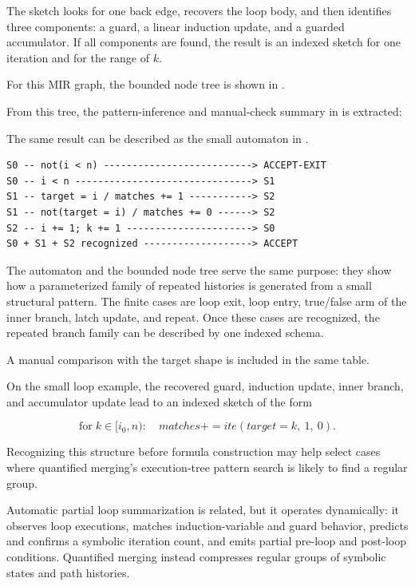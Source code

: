 \documentclass[conference]{IEEEtran}
\newcommand{\ite}{\mathit{ite}}
\begin{document}
The sketch looks for one back edge, recovers the loop body, and then identifies
three components: a guard, a linear induction update, and a guarded
accumulator. If all components are found, the result is an indexed sketch for
one iteration and for the range of \(k\).

For this MIR graph, the bounded node tree is shown in
.

From this tree, the pattern-inference and manual-check summary in
 is extracted:

The same result can be described as the small automaton in
.

\begin{lstlisting}[style=pseudo,caption={Finite automaton view of the recognized loop pattern.},label={lst:quantified-automaton}]
S0 -- not(i < n) --------------------------> ACCEPT-EXIT
S0 -- i < n -------------------------------> S1
S1 -- target = i / matches += 1 -----------> S2
S1 -- not(target = i) / matches += 0 ------> S2
S2 -- i += 1; k += 1 ----------------------> S0
S0 + S1 + S2 recognized -------------------> ACCEPT
\end{lstlisting}

The automaton and the bounded node tree serve the same purpose: they show how a
parameterized family of repeated histories is generated from a small structural
pattern. The finite cases are loop exit, loop entry, true/false arm of the
inner branch, latch update, and repeat. Once these cases are recognized, the
repeated branch family can be described by one indexed schema.

A manual comparison with the target shape is included in the same table.

On the small loop example, the recovered guard, induction update, inner branch,
and accumulator update lead to an indexed sketch of the form

\[
\text{for}\; k \in [i_0,n) \colon
\quad
\mathit{matches} \mathrel{+\!=} \ite(\mathit{target} = k,\ 1,\ 0).
\]

Recognizing this structure before formula construction may help select cases
where quantified merging's execution-tree pattern search is likely to find a
regular group.

Automatic partial loop summarization is related, but it operates dynamically:
it observes loop executions, matches induction-variable and guard behavior,
predicts and confirms a symbolic iteration count, and emits partial pre-loop
and post-loop conditions. Quantified merging instead compresses regular groups
of symbolic states and path histories.
\end{document}
